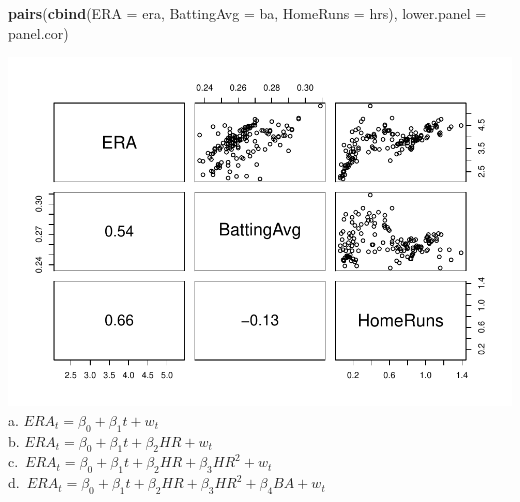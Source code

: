 \documentclass[
]{article}
\newenvironment{Shaded}{\begin{snugshade}}{\end{snugshade}}
\newcommand{\DataTypeTok}[1]{\textcolor[rgb]{0.13,0.29,0.53}{#1}}
\newcommand{\KeywordTok}[1]{\textcolor[rgb]{0.13,0.29,0.53}{\textbf{#1}}}
\newcommand{\NormalTok}[1]{#1}
\begin{document}
\begin{Shaded}
\begin{Highlighting}[]
\KeywordTok{pairs}\NormalTok{(}\KeywordTok{cbind}\NormalTok{(}\DataTypeTok{ERA =}\NormalTok{ era, }\DataTypeTok{BattingAvg =}\NormalTok{ ba, }\DataTypeTok{HomeRuns =}\NormalTok{ hrs), }\DataTypeTok{lower.panel =}\NormalTok{ panel.cor)}
\end{Highlighting}
\end{Shaded}

\includegraphics{project_files/figure-latex/unnamed-chunk-7-1.pdf} a.
\(ERA_t = \beta_0 + \beta_1 t + w_t\)\\
b. \(ERA_t = \beta_0 + \beta_1 t + \beta_2 HR + w_t\)\\
c.~\(ERA_t = \beta_0 + \beta_1 t + \beta_2 HR + \beta_3 HR^2 + w_t\)\\
d.~\(ERA_t = \beta_0 + \beta_1 t + \beta_2 HR + \beta_3 HR^2 + \beta_4 BA + w_t\)
\end{document}

